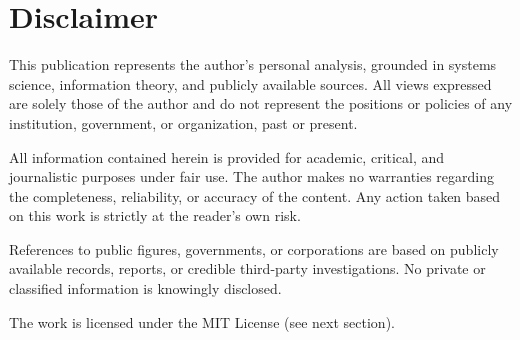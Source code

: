 \chapter*{Disclaimer}

This publication represents the author’s personal analysis, grounded in systems science, information theory, and publicly available sources. All views expressed are solely those of the author and do not represent the positions or policies of any institution, government, or organization, past or present.

All information contained herein is provided for academic, critical, and journalistic purposes under fair use. The author makes no warranties regarding the completeness, reliability, or accuracy of the content. Any action taken based on this work is strictly at the reader's own risk.

References to public figures, governments, or corporations are based on publicly available records, reports, or credible third-party investigations. No private or classified information is knowingly disclosed.

The work is licensed under the MIT License (see next section).
